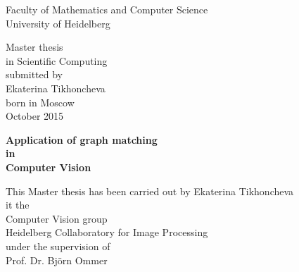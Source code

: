 \thispagestyle{empty}
\begin{center}
  \renewcommand{\baselinestretch}{2.00}
  \Large %
  Faculty of Mathematics and Computer Science\\
  \large University of Heidelberg
  \par\vfill\normalfont
  Master thesis\\
  in Scientific Computing\\
  submitted by\\
  Ekaterina Tikhoncheva\\
  born in Moscow\\
  \vspace{2\baselineskip}
  October 2015
\end{center}
\newpage

\thispagestyle{empty}
\begin{center}
  \renewcommand{\baselinestretch}{2.00}
  \Large\bfseries %
    Application of graph matching\\
    in\\
    Computer Vision
  \par
  \vfill
  \large\normalfont
  This Master thesis has been carried out by Ekaterina Tikhoncheva\\
  it the\\
  Computer Vision group\\
  Heidelberg Collaboratory for Image Processing\\
  under the supervision of\\
  Prof. Dr. Björn Ommer
\end{center}\par
\vspace{5\baselineskip}

\onehalfspacing